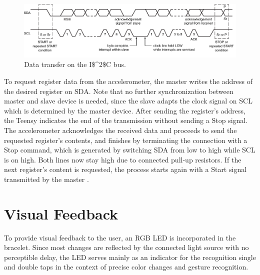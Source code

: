 \begin{figure}[bth]
	\myfloatalign
	\includegraphics[width=\linewidth]{gfx/i2c.pdf}
	\caption{Data transfer on the \ac{I$^2$C} bus. \cite{i2c}} \label{fig:i2c}
\end{figure}

To request register data from the accelerometer, the master writes the address of the desired register on \textsc{SDA}. Note that no further synchronization between master and slave device is needed, since the slave adapts the clock signal on \textsc{SCL} which is determined by the master device. After sending the register's address, the Teensy indicates the end of the transmission without sending a Stop signal. The accelerometer acknowledges the received data and proceeds to send the requested register's contents, and finishes by terminating the connection with a Stop command, which is generated by switching \textsc{SDA} from low to high while \textsc{SCL} is on high. Both lines now stay high due to connected pull-up resistors. If the next register's content is requested, the process starts again with a Start signal transmitted by the master \cite{i2c}.

\section{Visual Feedback}
To provide visual feedback to the user, an \textsc{RGB} \ac{LED} is incorporated in the bracelet. Since most changes are reflected by the connected light source with no perceptible delay, the \ac{LED} serves mainly as an indicator for the recognition single and double taps in the context of precise color changes and gesture recognition.